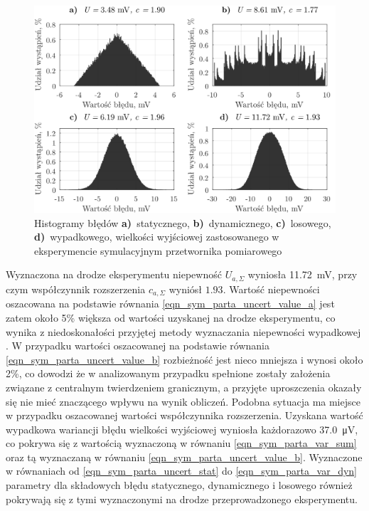 \begin{figure}[htb!]
\begin{center}
\includegraphics{obrazki/hist_part_a}
\caption{Histogramy błędów \textbf{a)}~statycznego, \textbf{b)}~dynamicznego, \textbf{c)}~losowego, \textbf{d)}~wypadkowego, wielkości wyjściowej zastosowanego w eksperymencie symulacyjnym przetwornika pomiarowego \label{fig_symul_parta_hist}}
\end{center}
\end{figure}

Wyznaczona na drodze eksperymentu niepewność $U_{a,\Sigma}$ wyniosła \qty{11.72}{mV}, przy czym współczynnik rozszerzenia $c_{a,\Sigma}$ wyniósł $1.93$. Wartość niepewności oszacowana na podstawie równania \eqref{eqn_sym_parta_uncert_value_a} jest zatem około 5\% większa od wartości uzyskanej na drodze eksperymentu, co wynika z niedoskonałości przyjętej metody wyznaczania niepewności wypadkowej \cite{jakubiec_system}. W przypadku wartości oszacowanej na podstawie równania \eqref{eqn_sym_parta_uncert_value_b} rozbieżność jest nieco mniejsza i wynosi około 2\%, co dowodzi że w analizowanym przypadku spełnione zostały założenia związane z centralnym twierdzeniem granicznym, a przyjęte uproszczenia okazały się nie mieć znaczącego wpływu na wynik obliczeń. Podobna sytuacja ma miejsce w przypadku oszacowanej wartości współczynnika rozszerzenia. Uzyskana wartość wypadkowa wariancji błędu wielkości wyjściowej wyniosła każdorazowo \qty{37.0}{\micro V}, co pokrywa się z wartością wyznaczoną w równaniu \eqref{eqn_sym_parta_var_sum} oraz tą wyznaczaną w równaniu \eqref{eqn_sym_parta_uncert_value_b}. Wyznaczone w równaniach od \eqref{eqn_sym_parta_uncert_stat} do \eqref{eqn_sym_parta_var_dyn} parametry dla składowych błędu statycznego, dynamicznego i losowego również pokrywają się z tymi wyznaczonymi na drodze przeprowadzonego eksperymentu.

